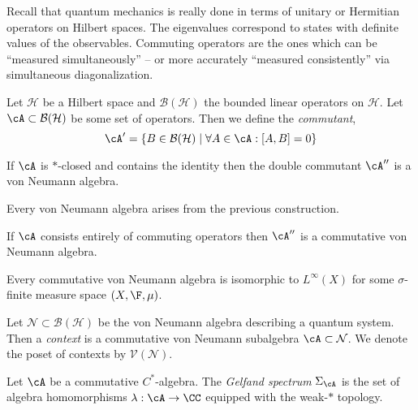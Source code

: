 \documentclass[12pt]{article}
\begin{document}
Recall that quantum mechanics is really done in terms of unitary or Hermitian operators on Hilbert spaces. The eigenvalues correspond to states with definite values of the observables. Commuting operators are the ones which can be ``measured simultaneously'' -- or more accurately ``measured consistently'' via simultaneous diagonalization. 

\newcommand{\B}{\mathcal{B}}
\newcommand{\cV}{\mathcal{V}}
\newcommand{\cN}{\mathcal{N}}
\newcommand{\Set}{\mathbf{Set}}
\renewcommand{\H}{\mathcal{H}}

\begin{defn}
Let $\H$ be a Hilbert space and $\B(\H)$ the bounded linear operators on $\H$. Let $\cA \subset \B(\H)$ be some set of operators. Then we define the \textit{commutant},
\[ \cA' = \{ B \in \B(\H) \mid \forall A \in \cA : [A, B] = 0 \} \]
\end{defn}

\begin{prop}
If $\cA$ is $*$-closed and contains the identity then the double commutant $\cA''$ is a von Neumann algebra. 
\end{prop}

\begin{rmk}
Every von Neumann algebra arises from the previous construction.
\end{rmk}

\begin{rmk}
If $\cA$ consists entirely of commuting operators then $\cA''$ is a commutative von Neumann algebra.
\end{rmk}

\begin{prop}
Every commutative von Neumann algebra is isomorphic to $L^\infty(X)$ for some $\sigma$-finite measure space $(X, \F, \mu)$. 
\end{prop}

\begin{defn}
Let $\cN \subset \B(\H)$ be the von Neumann algebra describing a quantum system. Then a \textit{context} is a commutative von Neumann subalgebra $\cA \subset \cN$. We denote the poset of contexts by $\cV(\cN)$.
\end{defn}

\begin{defn}
Let $\cA$ be a commutative $C^*$-algebra. The \textit{Gelfand spectrum} $\Sigma_{\cA}$ is the set of algebra homomorphisms $\lambda : \cA \to \CC$ equipped with the weak-$*$ topology.   
\end{defn}
\end{document}
